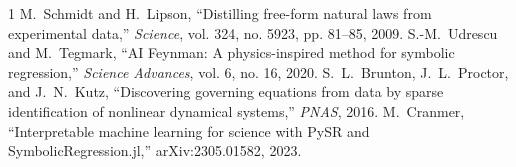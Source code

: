 \documentclass[10pt,journal,compsoc]{IEEEtran}
\begin{document}

\begin{thebibliography}{1}
 M.~Schmidt and H.~Lipson, ``Distilling free-form natural laws from experimental data,'' \emph{Science}, vol. 324, no. 5923, pp. 81--85, 2009.
 S.-M.~Udrescu and M.~Tegmark, ``AI Feynman: A physics-inspired method for symbolic regression,'' \emph{Science Advances}, vol. 6, no. 16, 2020.
 S.~L.~Brunton, J.~L.~Proctor, and J.~N.~Kutz, ``Discovering governing equations from data by sparse identification of nonlinear dynamical systems,'' \emph{PNAS}, 2016.
 M.~Cranmer, ``Interpretable machine learning for science with PySR and SymbolicRegression.jl,'' arXiv:2305.01582, 2023.
\end{thebibliography}
\end{document}
